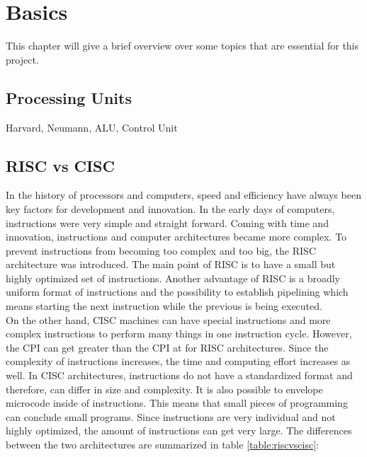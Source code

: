 
\chapter{Basics}
This chapter will give a brief overview over some topics that are essential for this project.
\section{Processing Units}
Harvard, Neumann, ALU, Control Unit
\section{RISC vs CISC}
In the history of processors and computers, speed and efficiency have always been key factors for development and innovation. In the early days of computers, instructions were very simple and straight forward. Coming with time and innovation, instructions and computer architectures became more complex. To prevent instructions from becoming too complex and too big, the \acf{RISC} architecture was introduced. The main point of RISC is to have a small but highly optimized set of instructions. Another advantage of RISC is a broadly uniform format of instructions and the possibility to establish pipelining which means starting the next instruction while the previous is being executed.\\
On the other hand, \acf{CISC} machines can have special instructions and more complex instructions to perform many things in one instruction cycle. However, the CPI can get greater than the CPI at for RISC architectures. Since the complexity of instructions increases, the time and computing effort increases as well. In CISC architectures, instructions do not have a standardized format and therefore, can differ in size and complexity. It is also possible to envelope microcode inside of instructions. This means that small pieces of programming can conclude small programs. Since instructions are very individual and not highly optimized, the amount of instructions can get very large. The differences between the two architectures are summarized in table \ref{table:riscvscisc}:

